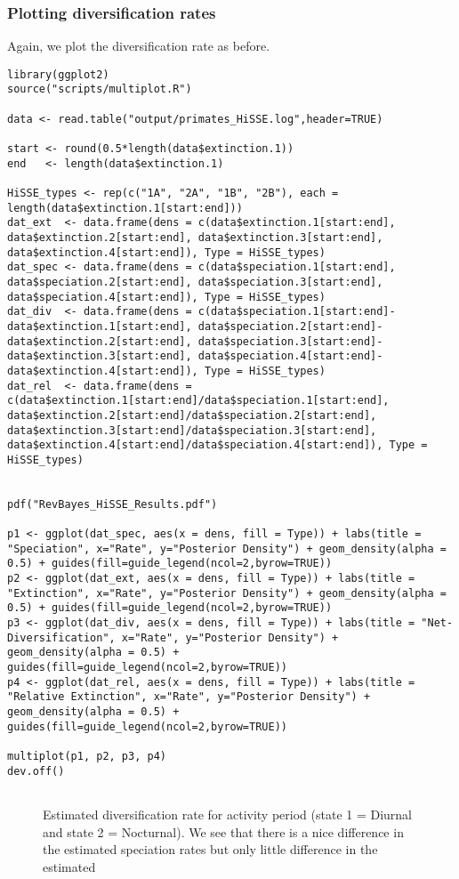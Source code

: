 \subsubsection{Plotting diversification rates}
Again, we plot the diversification rate as before.
{\tt \begin{snugshade*}
\begin{lstlisting}
library(ggplot2)
source("scripts/multiplot.R")

data <- read.table("output/primates_HiSSE.log",header=TRUE)

start <- round(0.5*length(data$extinction.1))
end   <- length(data$extinction.1)

HiSSE_types <- rep(c("1A", "2A", "1B", "2B"), each = length(data$extinction.1[start:end]))
dat_ext  <- data.frame(dens = c(data$extinction.1[start:end], data$extinction.2[start:end], data$extinction.3[start:end], data$extinction.4[start:end]), Type = HiSSE_types)
dat_spec <- data.frame(dens = c(data$speciation.1[start:end], data$speciation.2[start:end], data$speciation.3[start:end], data$speciation.4[start:end]), Type = HiSSE_types)
dat_div  <- data.frame(dens = c(data$speciation.1[start:end]-data$extinction.1[start:end], data$speciation.2[start:end]-data$extinction.2[start:end], data$speciation.3[start:end]-data$extinction.3[start:end], data$speciation.4[start:end]-data$extinction.4[start:end]), Type = HiSSE_types)
dat_rel  <- data.frame(dens = c(data$extinction.1[start:end]/data$speciation.1[start:end], data$extinction.2[start:end]/data$speciation.2[start:end], data$extinction.3[start:end]/data$speciation.3[start:end], data$extinction.4[start:end]/data$speciation.4[start:end]), Type = HiSSE_types)


pdf("RevBayes_HiSSE_Results.pdf")

p1 <- ggplot(dat_spec, aes(x = dens, fill = Type)) + labs(title = "Speciation", x="Rate", y="Posterior Density") + geom_density(alpha = 0.5) + guides(fill=guide_legend(ncol=2,byrow=TRUE))
p2 <- ggplot(dat_ext, aes(x = dens, fill = Type)) + labs(title = "Extinction", x="Rate", y="Posterior Density") + geom_density(alpha = 0.5) + guides(fill=guide_legend(ncol=2,byrow=TRUE))
p3 <- ggplot(dat_div, aes(x = dens, fill = Type)) + labs(title = "Net-Diversification", x="Rate", y="Posterior Density") + geom_density(alpha = 0.5) + guides(fill=guide_legend(ncol=2,byrow=TRUE))
p4 <- ggplot(dat_rel, aes(x = dens, fill = Type)) + labs(title = "Relative Extinction", x="Rate", y="Posterior Density") + geom_density(alpha = 0.5) + guides(fill=guide_legend(ncol=2,byrow=TRUE))

multiplot(p1, p2, p3, p4)
dev.off()


\end{lstlisting}
\end{snugshade*}}
\begin{figure}[h!]
\centering
{}
\caption{\small Estimated diversification rate for activity period (state 1 = Diurnal and state 2 = Nocturnal). We see that there is a nice difference in the estimated speciation rates but only little difference in the estimated}
\label{fig:div_rates_HiSSE}
\end{figure}


